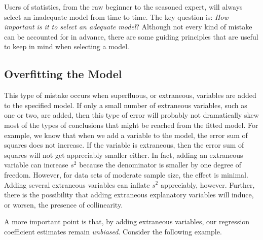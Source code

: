 Users of statistics, from the raw beginner to the seasoned expert,
will always select an inadequate model from time to time. The key
question is: \textit{How important is it to select an adequate
model}? Although not every kind of mistake can be accounted for in
advance, there are some guiding principles that are useful to keep
in mind when selecting a model.

\subsection{Overfitting the Model}

This type of mistake occurs when superfluous, or extraneous,
variables are added to the specified model. If only a small number
of extraneous variables, such as one or two, are added, then this
type of error will probably not dramatically skew most of the types
of conclusions that might be reached from the fitted model. For
example, we know that when we add a variable to the model, the error
sum of squares does not increase. If the variable is extraneous,
then the error sum of squares will not get appreciably smaller
either. In fact, adding an extraneous variable can increase $s^2$
because the denominator is smaller by one degree of freedom.
However, for data sets of moderate sample size, the effect is
minimal. Adding several extraneous variables can inflate $s^{2}$
appreciably, however. Further, there is the possibility that adding
extraneous explanatory variables will induce, or worsen, the
presence of collinearity.

A more important point is that, by adding extraneous variables, our
regression coefficient estimates remain \textit{unbiased}. Consider
the following example.

\linejed

